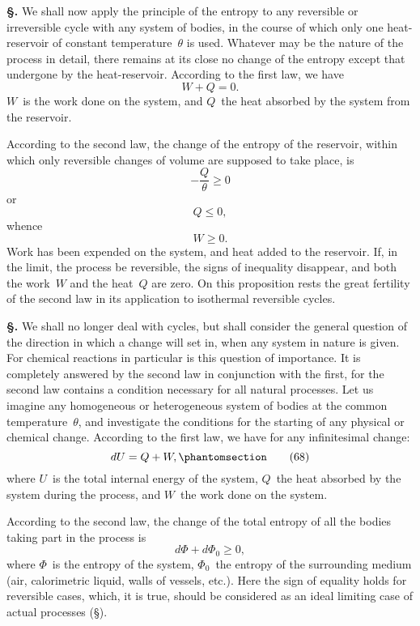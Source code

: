 \documentclass[12pt]{book}[2005/09/16]
\newcommand{\Chg}[2]{#2}
\newcommand{\Add}[1]{\Chg{}{#1}}
\newcommand{\Section}[1]{
  \medskip\par\textbf{§\;#1}
  \label{section:#1}
}
\newcommand{\SecRef}[2][§\;]{\hyperref[section:#2.]{{\upshape #1#2}}}
\newcommand{\Tag}[1]{%
  \phantomsection\label{eqn:#1}\tag*{\ensuremath{#1}}%
}
\newcommand{\PageSep}[1]{\ignorespaces}
\begin{document}
\Section{139.} We shall now apply the principle of the entropy
to any reversible or irreversible cycle with any system of
bodies, in the course of which only one heat-reservoir of
constant temperature~$\theta$ is used. Whatever may be the
nature of the process in detail, there remains at its close no
change of the entropy except that undergone by the heat-reservoir.
According to the first law, we have
\[
W + Q = 0.
\]
$W$~is the work done on the system, and $Q$~the heat absorbed
by the system from the reservoir.

According to the second law, the change of the entropy
\PageSep{108}
of the reservoir, within which only reversible changes of
volume are supposed to take place, is
\[
-\frac{Q}{\theta} \geq 0
\]
or
\[
Q \leq 0,
\]
whence
\[
W \geq 0.
\]
Work has been expended on the system, and heat added
to the reservoir. If, in the limit, the process be reversible,
the signs of inequality disappear, and both the work~$W$
and the heat~$Q$ are zero. On this proposition rests the great
fertility of the second law in its application to isothermal
reversible cycles.

\Section{140.} We shall no longer deal with cycles, but shall
%
%
consider the general question of the direction in which a
change will set in, when any system in nature is given.
For chemical reactions in particular is this question of
importance. It is completely answered by the second
law in conjunction with the first, for the second law contains
a condition necessary for all natural processes. Let
us imagine any homogeneous or heterogeneous system of
bodies at the common temperature~$\theta$, and investigate the
conditions for the starting of any physical or chemical
change. According to the first law, we have for any
infinitesimal change:
\[
dU = Q + W,
\Tag{(68)}
\]
where $U$~is the total internal energy of the system, $Q$~the
heat absorbed by the system during the process, and $W$~the
work done on the system.

According to the second law, the change of the total
entropy of all the bodies taking part in the process is
\[
d\Phi + d\Phi_{0} \geq 0\Add{,}
\]
where $\Phi$~is the entropy of the system, $\Phi_{0}$~the entropy of
the surrounding medium (air, calorimetric liquid, walls of
\PageSep{109}
vessels, etc.). Here the sign of equality holds for reversible
cases, which, it is true, should be considered as an ideal
limiting case of actual processes (\SecRef{115}).
\end{document}
